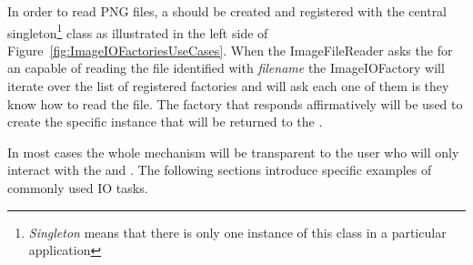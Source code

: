 In order to read PNG files, a  should be created and
registered with the central 
singleton\footnote{\emph{Singleton} means that there is only one instance of
this class in a particular application} class as illustrated in the left side
of Figure~\ref{fig:ImageIOFactoriesUseCases}. When the ImageFileReader asks the
 for an  capable of reading the file
identified with \emph{filename} the ImageIOFactory will iterate over the list
of registered factories and will ask each one of them is they know how to read
the file. The factory that responds affirmatively will be used to create the
specific  instance that will be returned to the
.

In most cases the whole mechanism will be transparent to the user who will only
interact with the  and . The following
sections introduce specific examples of commonly used IO tasks. 







